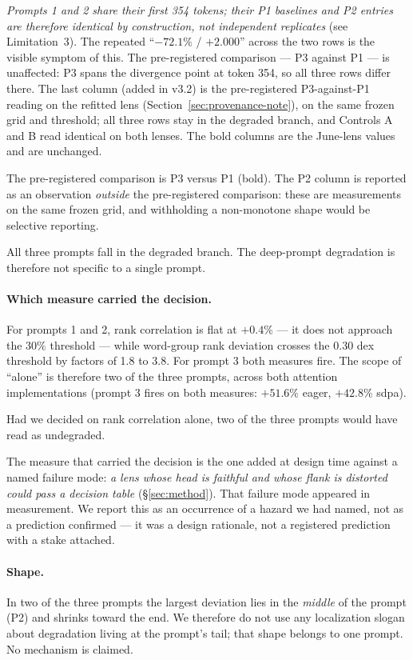\documentclass[11pt]{article}
\begin{document}
\noindent\emph{Prompts 1 and 2 share their first 354 tokens; their P1
baselines and P2 entries are therefore identical by construction, not
independent replicates} (see Limitation~3). The repeated ``$-72.1\%$ /
$+2.000$'' across the two rows is the visible symptom of this. The
pre-registered comparison --- P3 against P1 --- is unaffected: P3 spans
the divergence point at token 354, so all three rows differ there.
The last column (added in v3.2) is the pre-registered P3-against-P1
reading on the refitted lens (Section~\ref{sec:provenance-note}), on the
same frozen grid and threshold; all three rows stay in the degraded
branch, and Controls A and B read identical on both lenses. The bold
columns are the June-lens values and are unchanged.

The pre-registered comparison is P3 versus P1 (bold). The P2 column is
reported as an observation \emph{outside} the pre-registered comparison:
these are measurements on the same frozen grid, and withholding a
non-monotone shape would be selective reporting.

All three prompts fall in the degraded branch. The deep-prompt
degradation is therefore not specific to a single prompt.

\paragraph{Which measure carried the decision.}
For prompts 1 and 2, rank correlation is flat at $+0.4\%$ --- it does not
approach the $30\%$ threshold --- while word-group rank deviation crosses
the $0.30$ dex threshold by factors of 1.8 to 3.8. For prompt 3 both
measures fire. The scope of ``alone'' is therefore two of the three
prompts, across both attention implementations (prompt 3 fires on both
measures: $+51.6\%$ eager, $+42.8\%$ sdpa).

Had we decided on rank correlation alone, two of the three prompts would
have read as undegraded.

The measure that carried the decision is the one added at design time
against a named failure mode: \emph{a lens whose head is faithful and
whose flank is distorted could pass a decision table}
(\S\ref{sec:method}). That failure mode appeared in measurement. We
report this as an occurrence of a hazard we had named, not as a
prediction confirmed --- it was a design rationale, not a registered
prediction with a stake attached.

\paragraph{Shape.}
In two of the three prompts the largest deviation lies in the
\emph{middle} of the prompt (P2) and shrinks toward the end. We therefore
do not use any localization slogan about degradation living at the
prompt's tail; that shape belongs to one prompt. No mechanism is claimed.
\end{document}
